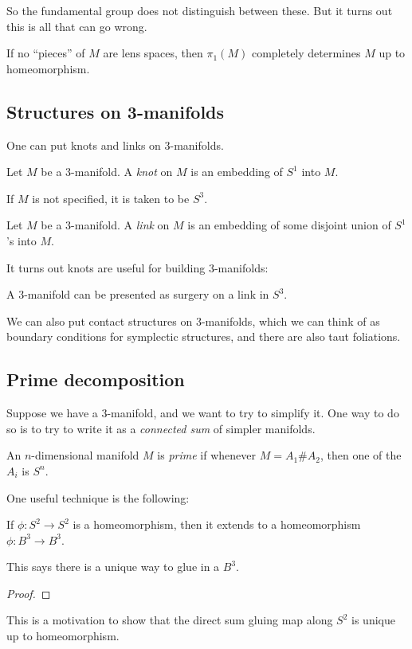 \documentclass[a4paper]{article}
\begin{document}
So the fundamental group does not distinguish between these. But it turns out this is all that can go wrong.
\begin{thm}[Perelman]
  If no ``pieces'' of $M$ are lens spaces, then $\pi_1(M)$ completely determines $M$ up to homeomorphism.
\end{thm}

\subsection{Structures on 3-manifolds}
One can put knots and links on $3$-manifolds.
\begin{defi}[Knot]
  Let $M$ be a $3$-manifold. A \emph{knot} on $M$ is an embedding of $S^1$ into $M$.
\end{defi}
If $M$ is not specified, it is taken to be $S^3$.
\begin{defi}[Link]
  Let $M$ be a $3$-manifold. A \emph{link} on $M$ is an embedding of some disjoint union of $S^1$'s into $M$.
\end{defi}
It turns out knots are useful for building $3$-manifolds:
\begin{thm}[Dehn]
  A $3$-manifold can be presented as surgery on a link in $S^3$.
\end{thm}

We can also put contact structures on $3$-manifolds, which we can think of as boundary conditions for symplectic structures, and there are also taut foliations.

\subsection{Prime decomposition}
Suppose we have a 3-manifold, and we want to try to simplify it. One way to do so is to try to write it as a \emph{connected sum} of simpler manifolds.


\begin{defi}
  An $n$-dimensional manifold $M$ is \emph{prime} if whenever $M = A_1 \# A_2$, then one of the $A_i$ is $S^n$.
\end{defi}

One useful technique is the following:
\begin{thm}
  If $\phi: S^2 \to S^2$ is a homeomorphism, then it extends to a homeomorphism $\phi: B^3 \to B^3$.
\end{thm}
This says there is a unique way to glue in a $B^3$.
\begin{proof}
\end{proof}
This is a motivation to show that the direct sum gluing map along $S^2$ is unique up to homeomorphism.
\end{document}
